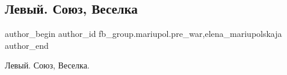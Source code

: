  
 
 
 
 

\subsection{Левый. Союз, Веселка}
\label{sec:02_01_2023.fb.fb_group.mariupol.pre_war.1.levii__soyuz__veselk}
 
\ifcmt
 author_begin
   author_id fb_group.mariupol.pre_war,elena_mariupolskaja
 author_end
\fi

Левый. Союз, Веселка.
